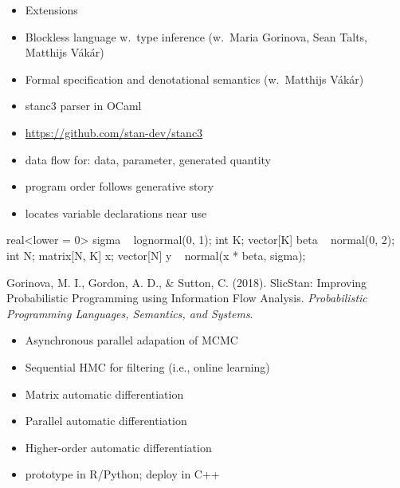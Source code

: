 \documentclass[10pt]{report}
\begin{document}

\begin{itemize}
\item Extensions
\item Blockless language w.\ type inference (w.\ Maria Gorinova, Sean Talts, Matthijs V\'ak\'ar)
\item Formal specification and denotational semantics (w.\ Matthijs V\'ak\'ar)
\item stanc3 parser in OCaml
\item {\footnotesize \url{https://github.com/stan-dev/stanc3}}
\end{itemize}

\begin{itemize}
\item data flow for: data, parameter, generated quantity
\item program order follows generative story
\item locates variable declarations near use
\end{itemize}
\begin{stancode}
real<lower = 0> sigma ~ lognormal(0, 1);
int K;
vector[K] beta ~ normal(0, 2);
int N;
matrix[N, K] x;
vector[N] y ~ normal(x * beta, sigma);
\end{stancode}
\begin{subitemize}
\footnotesize \item 
Gorinova, M. I., Gordon, A. D., \& Sutton, C. (2018). SlicStan:
Improving Probabilistic Programming using Information Flow Analysis.
{\slshape Probabilistic Programming Languages, Semantics, and Systems}.
\end{subitemize}

\begin{itemize}
\item Asynchronous parallel adapation of MCMC
\item Sequential HMC for filtering (i.e., online learning)
\item Matrix automatic differentiation
\item Parallel automatic differentiation
\item Higher-order automatic differentiation
\item prototype in R/Python; deploy in C++
\end{itemize}
\end{document}
